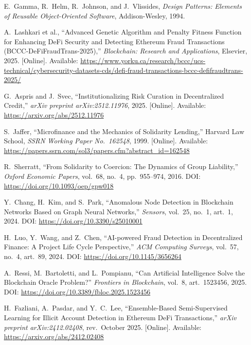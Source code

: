 \documentclass[12pt,a4paper]{report}
\begin{document}
{\begin{enumerate}[label={[\arabic*]}]
\item E.~Gamma, R.~Helm, R.~Johnson, and J.~Vlissides, \textit{Design Patterns:
Elements of Reusable Object-Oriented Software}, Addison-Wesley, 1994.

\item A.~Lashkari et al., ``Advanced Genetic Algorithm and Penalty Fitness Function for Enhancing DeFi Security and Detecting Ethereum Fraud Transactions (BCCC-DeFiFraudTrans-2025),'' \textit{Blockchain: Research and Applications}, Elsevier, 2025. [Online]. Available: \url{https://www.yorku.ca/research/bccc/ucs-technical/cybersecurity-datasets-cds/defi-fraud-transactions-bccc-defifraudtrans-2025/}

\item G.~Aspris and J.~Svec, ``Institutionalizing Risk Curation in Decentralized Credit,'' \textit{arXiv preprint arXiv:2512.11976}, 2025. [Online]. Available: \url{https://arxiv.org/abs/2512.11976}

\item S.~Jaffer, ``Microfinance and the Mechanics of Solidarity Lending,'' Harvard Law School, \textit{SSRN Working Paper No.~162548}, 1999. [Online]. Available: \url{https://papers.ssrn.com/sol3/papers.cfm?abstract_id=162548}

\item R.~Sherratt, ``From Solidarity to Coercion: The Dynamics of Group Liability,'' \textit{Oxford Economic Papers}, vol.~68, no.~4, pp.~955--974, 2016. DOI: \url{https://doi.org/10.1093/oep/gpw018}

\item Y.~Chang, H.~Kim, and S.~Park, ``Anomalous Node Detection in Blockchain Networks Based on Graph Neural Networks,'' \textit{Sensors}, vol.~25, no.~1, art.~1, 2024. DOI: \url{https://doi.org/10.3390/s25010001}

\item H.~Luo, Y.~Wang, and Z.~Chen, ``AI-powered Fraud Detection in Decentralized Finance: A Project Life Cycle Perspective,'' \textit{ACM Computing Surveys}, vol.~57, no.~4, art.~89, 2024. DOI: \url{https://doi.org/10.1145/3656264}

\item A.~Ressi, M.~Bartoletti, and L.~Pompianu, ``Can Artificial Intelligence Solve the Blockchain Oracle Problem?'' \textit{Frontiers in Blockchain}, vol.~8, art.~1523456, 2025. DOI: \url{https://doi.org/10.3389/fbloc.2025.1523456}

\item H.~Fazliani, A.~Pasdar, and Y.~C.~Lee, ``Ensemble-Based Semi-Supervised Learning for Illicit Account Detection in Ethereum DeFi Transactions,'' \textit{arXiv preprint arXiv:2412.02408}, rev.~October 2025. [Online]. Available: \url{https://arxiv.org/abs/2412.02408}


\end{enumerate}}
\end{document}
